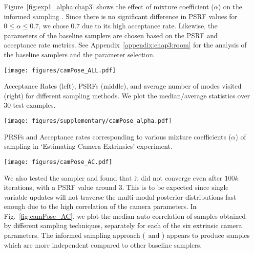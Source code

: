 Figure~\ref{fig:exp1_alpha:chap3} shows the effect of mixture
coefficient ($\alpha$) on the informed sampling
\MIXLMH. Since there is no significant difference in PSRF values for
$0 \le \alpha \le 0.7$, we chose $0.7$ due to its high acceptance
rate.
Likewise, the parameters of the baseline samplers are chosen based on the PSRF and acceptance rate metrics.
See Appendix~\ref{appendix:chap3:room} for the analysis of the baseline samplers and the parameter selection.

\begin{figure*}[!t]
\begin{center}
\centerline{\texttt{[image: figures/camPose\_ALL.pdf]}}
  {Acceptance Rates (left), PSRFs (middle), and average number of modes
  visited (right) for different sampling methods. We plot the
  median/average statistics over 30 test examples.}
\label{fig:camPose_ALL}
\vspace{-0.3cm}
\end{center}
\end{figure*}

\begin{figure*}[h]
\centerline{\texttt{[image: figures/supplementary/camPose\_alpha.pdf]}}
{PRSFs and Acceptance rates corresponding to various mixture coefficients ($\alpha$) of \MIXLMH sampling in `Estimating Camera Extrinsics' experiment.}
\label{fig:exp1_alpha:chap3}
\end{figure*}

\begin{figure*}[!t]
\begin{center}
\centerline{\texttt{[image: figures/camPose\_AC.pdf]}}
\label{fig:camPose_AC}
\vspace{-0.3cm}
\end{center}
\end{figure*}


We also tested the \MHWG sampler and found that it did not converge
even after $100k$ iterations, with a PSRF value around 3. This is to be
expected since single variable updates will not traverse the
multi-modal posterior distributions fast enough due to the high
correlation of the camera parameters. In Fig.~\ref{fig:camPose_AC}, we plot the median
auto-correlation of samples obtained by different sampling techniques,
separately for each of the six extrinsic camera parameters. The
informed sampling approach (\MIXLMH~and \INDLMH) appears to produce samples which
are more independent compared to other baseline samplers.

